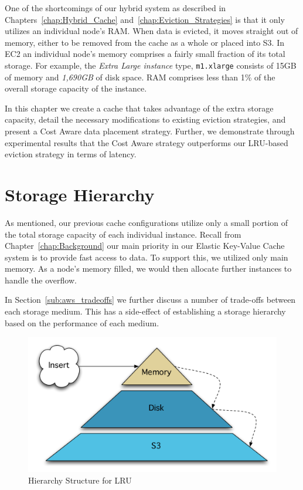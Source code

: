 One of the shortcomings of our hybrid system as described in
Chapters~\ref{chap:Hybrid_Cache} and~\ref{chap:Eviction_Strategies} is that it
only utilizes an individual node's RAM\@. When data is evicted, it moves
straight out of memory, either to be removed from the cache as a whole or
placed into S3. In EC2 an individual node's memory comprises a fairly small
fraction of its total storage. For example, the \emph{Extra Large instance}
type, {\tt m1.xlarge} consists of 15GB of memory and \emph{1,690GB} of disk
space.  RAM comprises less than 1\% of the overall storage capacity of the
instance.

In this chapter we create a cache that takes advantage of the extra storage
capacity, detail the necessary modifications to existing eviction strategies,
and present a Cost Aware data placement strategy. Further, we demonstrate
through experimental results that the Cost Aware strategy outperforms our
LRU-based eviction strategy in terms of latency.

\section{Storage Hierarchy} %
\label{sec:storage_hierarchy}
As mentioned, our previous cache configurations utilize only a small portion of
the total storage capacity of each individual instance. Recall from
Chapter~\ref{chap:Background} our main priority in our Elastic Key-Value Cache
system is to provide fast access to data. To support this, we utilized only
main memory. As a node's memory filled, we would then allocate further
instances to handle the overflow.

In Section~\ref{sub:aws_tradeoffs} we further discuss a number of trade-offs
between each storage medium. This has a side-effect of establishing a storage
hierarchy based on the performance of each medium.

\begin{figure}
\begin{center}
\includegraphics[scale=0.5]{figures/hierarchy-lru.pdf}
\end{center}
\caption{Hierarchy Structure for LRU}
\label{fig:hierarchy_lru}
\end{figure}

